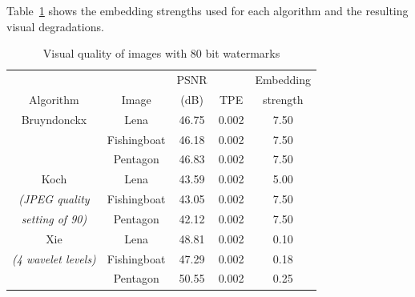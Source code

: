 \documentclass[10pt,twocolumn]{article}
\begin{document}
Table~\ref{bkxVQBKX} shows the embedding strengths used for each algorithm and
the resulting visual degradations. 
\begin{table}[!htb]
\footnotesize
        \begin{center}
                \begin{tabular}{|c|c|c|c|c|} \hline
				& 		 & PSNR		&      	& Embedding   	\\	
                Algorithm	&Image           & (dB)     	& TPE  	& strength    	\\ \hline \hline
                Bruyndonckx	&Lena            & 46.75        & 0.002	& 7.50          \\ \cline{2-5}
                		&Fishingboat     & 46.18        & 0.002	& 7.50          \\ \cline{2-5}
                		&Pentagon        & 46.83        & 0.002	& 7.50          \\ \hline\hline
                Koch		&Lena            & 43.59        & 0.002 & 5.00          \\ \cline{2-5}
                \scriptsize\emph{(JPEG quality}\normalsize	
				&Fishingboat     & 43.05        & 0.002 & 7.50          \\ \cline{2-5}
                \scriptsize\emph{setting of 90)}\normalsize		
				&Pentagon        & 42.12        & 0.002 & 7.50          \\ \hline\hline
                Xie		&Lena            & 48.81        & 0.002 & 0.10          \\ \cline{2-5}
                \scriptsize\emph{(4 wavelet levels)}\normalsize	
				&Fishingboat     & 47.29        & 0.002 & 0.18          \\ \cline{2-5}
                		&Pentagon        & 50.55        & 0.002 & 0.25          \\ \hline
                \end{tabular}
		\caption{Visual quality of 
			images with 80 bit watermarks} 
                \label{bkxVQBKX}
        \end{center}
\end{table}
\end{document}

